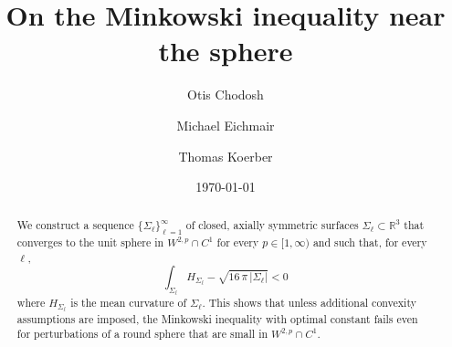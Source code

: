 \documentclass[11pt]{amsart}
\title{On the Minkowski inequality near the sphere}
\author{Otis Chodosh}
\author{Michael Eichmair}
\author{Thomas Koerber}
\theoremstyle {definition}
\begin{document}
\date{\today}
\begin{abstract}
We construct a sequence $\{\Sigma_\ell\}_{\ell=1}^\infty$ of closed, axially symmetric surfaces $\Sigma_\ell\subset \mathbb{R}^3$ that converges to the unit sphere in $W^{2,p}\cap C^1$ for every $p\in[1,\infty)$ and such that, for every $\ell$,
$$
\int_{\Sigma_{\ell}}H_{\Sigma_\ell}-\sqrt{16\,\pi\,|\Sigma_{\ell}|}<0
$$
where $H_{\Sigma_\ell}$ is the mean curvature of $\Sigma_\ell$.
 This shows that unless additional convexity assumptions are imposed, the Minkowski inequality with optimal constant fails even for perturbations  of a round sphere that are small in $W^{2,p}\cap C^1$.
\end{abstract}
\maketitle
\end{document}
